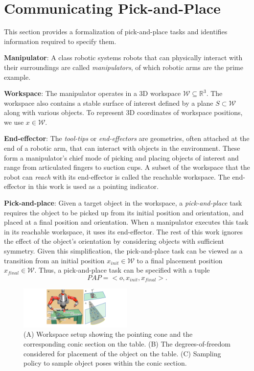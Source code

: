 \section{Communicating Pick-and-Place}
\label{problem}

This section provides a formalization of pick-and-place tasks and identifies  information required to specify them.
 
\noindent\textbf{Manipulator}: A class robotic systems robots that can physically interact with their surroundings are called \textit{manipulators}, of which robotic arms are the prime example. 

\noindent\textbf{Workspace}: The manipulator operates in a 3D workspace $\mathcal{W} \subseteq \mathbb{R}^3$. The workspace also contains a stable surface of interest defined by a plane $S\subset\mathcal{W}$ along with various objects. To represent 3D coordinates of workspace positions, we use $x\in\mathcal{W}$. 

\noindent\textbf{End-effector}: The \textit{tool-tips} or \textit{end-effectors} are geometries, often attached at the end of a robotic arm, that can interact with objects in the environment. These form a manipulator's chief mode of picking and placing objects of interest and range from articulated fingers to suction cups. A subset of the workspace that the robot can \textit{reach} with its end-effector is called the reachable workspace. The end-effector in this work is used as a pointing indicator.

\noindent\textbf{Pick-and-place}: Given a target object in the workspace, a \textit{pick-and-place} task requires the object to be picked up from its initial position and orientation, and placed at a final position and orientation. When a manipulator executes this task in its reachable workspace, it uses its end-effector. 
The rest of this work ignores the effect of the object's orientation by considering objects with sufficient symmetry. Given this simplification, the pick-and-place task can be viewed as a transition from an initial position $x_{init}\in\mathcal{W}$ to a final placement position $x_{final}\in\mathcal{W}$.  Thus, a pick-and-place task can be specified with a tuple
$$ PAP = < o, x_{init}, x_{final} >. $$


\begin{figure}[t]
    \centering
    \includegraphics[width=0.5\textwidth]{pointing_diagram}
    \caption{(A) Workspace setup showing the pointing cone and the corresponding conic section on the table. (B) The degrees-of-freedom considered for placement of the object on the table. (C) Sampling policy to sample object poses within the conic section.}
    \label{fig:pointing}
\end{figure}


